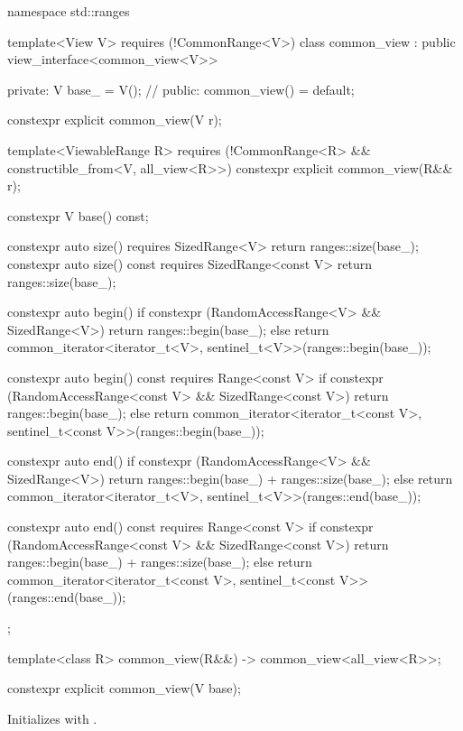 \begin{codeblock}
namespace std::ranges {
  template<View V>
    requires (!CommonRange<V>)
  class common_view : public view_interface<common_view<V>> {
  private:
    V base_ = V();  // \expos
  public:
    common_view() = default;

    constexpr explicit common_view(V r);

    template<ViewableRange R>
      requires (!CommonRange<R> && constructible_from<V, all_view<R>>)
    constexpr explicit common_view(R&& r);

    constexpr V base() const;

    constexpr auto size() requires SizedRange<V> {
      return ranges::size(base_);
    }
    constexpr auto size() const requires SizedRange<const V> {
      return ranges::size(base_);
    }

    constexpr auto begin() {
      if constexpr (RandomAccessRange<V> && SizedRange<V>)
        return ranges::begin(base_);
      else
        return common_iterator<iterator_t<V>, sentinel_t<V>>(ranges::begin(base_));
    }

    constexpr auto begin() const requires Range<const V> {
      if constexpr (RandomAccessRange<const V> && SizedRange<const V>)
        return ranges::begin(base_);
      else
        return common_iterator<iterator_t<const V>, sentinel_t<const V>>(ranges::begin(base_));
    }

    constexpr auto end() {
      if constexpr (RandomAccessRange<V> && SizedRange<V>)
        return ranges::begin(base_) + ranges::size(base_);
      else
        return common_iterator<iterator_t<V>, sentinel_t<V>>(ranges::end(base_));
    }

    constexpr auto end() const requires Range<const V> {
      if constexpr (RandomAccessRange<const V> && SizedRange<const V>)
        return ranges::begin(base_) + ranges::size(base_);
      else
        return common_iterator<iterator_t<const V>, sentinel_t<const V>>(ranges::end(base_));
    }
  };

  template<class R>
    common_view(R&&) -> common_view<all_view<R>>;
}
\end{codeblock}

%
\begin{itemdecl}
constexpr explicit common_view(V base);
\end{itemdecl}

\begin{itemdescr}
\pnum
\effects Initializes  with .
\end{itemdescr}

